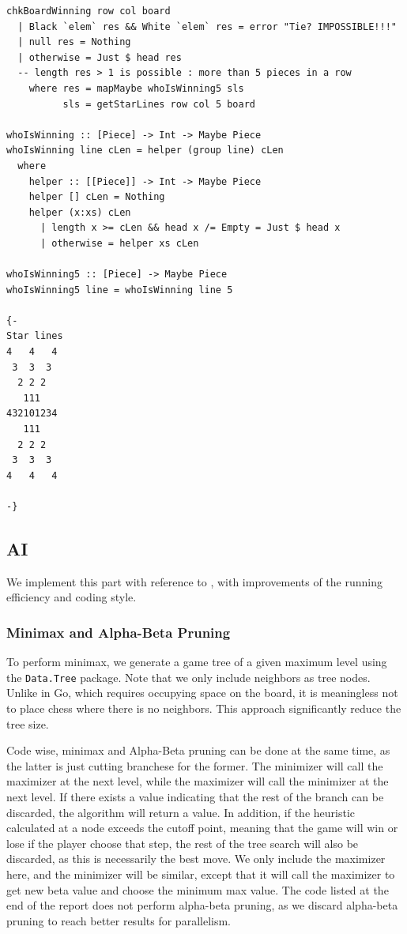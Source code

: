 \documentclass[twoside,11pt]{homework}
\begin{document}
\begin{verbatim}
chkBoardWinning row col board
  | Black `elem` res && White `elem` res = error "Tie? IMPOSSIBLE!!!"
  | null res = Nothing
  | otherwise = Just $ head res
  -- length res > 1 is possible : more than 5 pieces in a row
    where res = mapMaybe whoIsWinning5 sls
          sls = getStarLines row col 5 board

whoIsWinning :: [Piece] -> Int -> Maybe Piece
whoIsWinning line cLen = helper (group line) cLen
  where
    helper :: [[Piece]] -> Int -> Maybe Piece
    helper [] cLen = Nothing
    helper (x:xs) cLen
      | length x >= cLen && head x /= Empty = Just $ head x
      | otherwise = helper xs cLen

whoIsWinning5 :: [Piece] -> Maybe Piece
whoIsWinning5 line = whoIsWinning line 5

{-
Star lines
4   4   4
 3  3  3 
  2 2 2  
   111   
432101234
   111   
  2 2 2  
 3  3  3 
4   4   4

-}
\end{verbatim}

\subsection{AI}
We implement this part with reference to \cite{past-project}, with improvements of the running efficiency and coding style.

\subsubsection{Minimax and Alpha-Beta Pruning}
To perform minimax, we generate a game tree of a given maximum level using the \texttt{Data.Tree} package. Note that we only include neighbors as tree nodes. Unlike in Go, which requires occupying space on the board, it is meaningless not to place chess where there is no neighbors. This approach significantly reduce the tree size.

Code wise, minimax and Alpha-Beta pruning can be done at the same time, as the latter is just cutting branchese for the former. The minimizer will call the maximizer at the next level, while the maximizer will call the minimizer at the next level. If there exists a value indicating that the rest of the branch can be discarded, the algorithm will return a value. In addition, if the heuristic calculated at a node exceeds the cutoff point, meaning that the game will win or lose if the player choose that step, the rest of the tree search will also be discarded, as this is necessarily the best move. We only include the maximizer here, and the minimizer will be similar, except that it will call the maximizer to get new beta value and choose the minimum max value. The code listed at the end of the report does not perform alpha-beta pruning, as we discard alpha-beta pruning to reach better results for parallelism.
\end{document}
